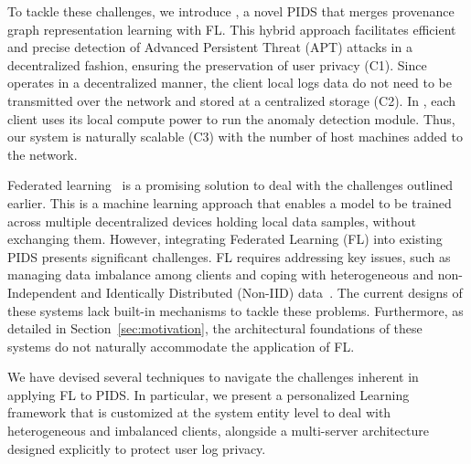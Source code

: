 
To tackle these challenges, we introduce \Sys, a novel PIDS that merges provenance graph representation learning with FL. This hybrid approach facilitates efficient and precise detection of Advanced Persistent Threat (APT) attacks in a decentralized fashion, ensuring the preservation of user privacy (C1). Since \Sys operates in a decentralized manner, the client local logs data do not need to be transmitted over the network and stored at a centralized storage (C2). In \Sys, each client uses its local compute power to run the \Sys anomaly detection module. Thus, our system is naturally scalable (C3) with the number of host machines added to the network.


Federated learning~\cite{mcmahan2017communication} is a promising solution to deal with the challenges outlined earlier. This is a machine learning approach that enables a model to be trained across multiple decentralized devices holding local data samples, without exchanging them. However, integrating Federated Learning (FL) into existing PIDS presents significant challenges. FL requires addressing key issues, such as managing data imbalance among clients and coping with heterogeneous and non-Independent and Identically Distributed (Non-IID) data~\cite{zhao2018federated}. The current designs of these systems lack built-in mechanisms to tackle these problems. Furthermore, as detailed in Section~\ref{sec:motivation}, the architectural foundations of these systems do not naturally accommodate the application of FL.

We have devised several techniques to navigate the challenges inherent in applying FL to PIDS. In particular, we present a personalized \gnnshort Learning framework that is customized at the system entity level to deal with heterogeneous and imbalanced clients, alongside a multi-server architecture designed explicitly to protect user log privacy.


